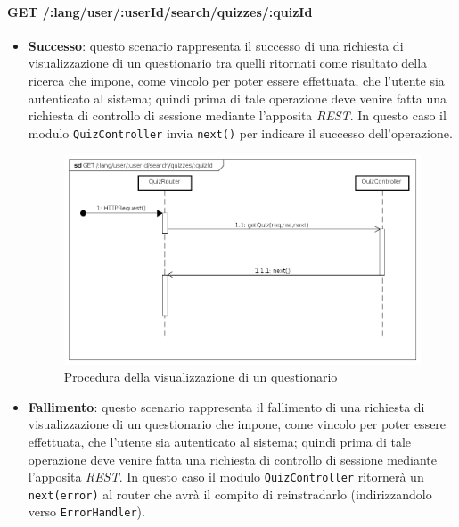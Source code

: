 \paragraph{GET /:lang/user/:userId/search/quizzes/:quizId}
\begin{itemize}
\item \textbf{Successo}: questo scenario rappresenta il successo di una richiesta di visualizzazione di un questionario tra quelli ritornati come risultato della ricerca che impone, come vincolo per poter essere effettuata, che l'utente sia autenticato al sistema; quindi prima di tale operazione deve venire fatta una richiesta di controllo di sessione mediante l'apposita \textit{REST}. In questo caso il modulo \texttt{QuizController} invia \texttt{next()} per indicare il successo dell'operazione.

\begin{figure}[ht]
	\centering
	\includegraphics[scale=0.45]{UML/DiagrammiDiSequenza/Back-end/GET__lang_user__userId_search_quizzes__quizId_success.png}
	\caption{Procedura della visualizzazione di un questionario}
\end{figure}
\FloatBarrier

\item \textbf{Fallimento}: questo scenario rappresenta il fallimento di una richiesta di visualizzazione di un questionario che impone, come vincolo per poter essere effettuata, che l'utente sia autenticato al sistema; quindi prima di tale operazione deve venire fatta una richiesta di controllo di sessione mediante l'apposita \textit{REST}. In questo caso il modulo \texttt{QuizController} ritornerà un \texttt{next(error)} al router che avrà il compito di reinstradarlo (indirizzandolo verso \texttt{ErrorHandler}).


\end{itemize}
